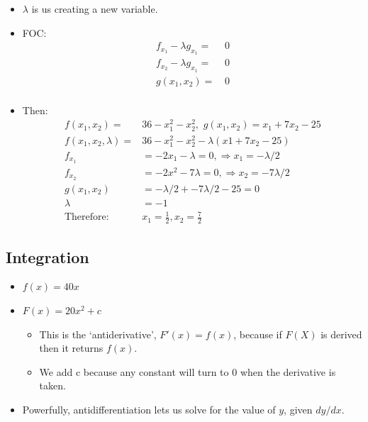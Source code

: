 \begin{itemize}
    \item $\lambda$ is us creating a new variable.
    \item FOC: 
    \begin{align*}
        f_{x_1} - \lambda g_{x_1} = & \, 0 \\
        f_{x_2} - \lambda g_{x_1} = & \, 0 \\
        g(x_1, x_2) = & \, 0 \\
    \end{align*}
        \item Then:
    \begin{align*}
        f(x_1, x_2) = & 36 - x_1^2 - x_2^2, \, \, g(x_1, x_2) = x_1 + 7x_2 - 25  \\ 
        f(x_1, x_2, \lambda) = & 36 - x_1^2 - x_2^2 - \lambda(x1 + 7x_2 - 25) \\
        f_{x_1} & = -2x_1 - \lambda = 0, \Rightarrow x_1 = -\lambda/2 \\
        f_{x_2} & = - 2x^2 - 7\lambda = 0, \Rightarrow x_2 = -7\lambda/2 \\
        g(x_1, x_2) & = -\lambda/2 + -7\lambda/2 - 25 = 0 \\ 
        \lambda & = -1 \\
        \text{Therefore: } & x_1 = \frac{1}{2}, x_2 = \frac{7}{2} 
    \end{align*}
\end{itemize}

\subsection{Integration}

\begin{itemize}
    \item $f(x) = 40x$
    \item $F(x) = 20x^2 + c$
    \begin{itemize}
        \item This is the `antiderivative', $F'(x) = f(x)$, because if $F(X)$ is derived then it returns $f(x)$.
        \item We add c because any constant will turn to 0 when the derivative is taken. 
    \end{itemize}
    \item Powerfully, antidifferentiation lets us solve for the value of $y$, given $dy/dx$.
\end{itemize}


